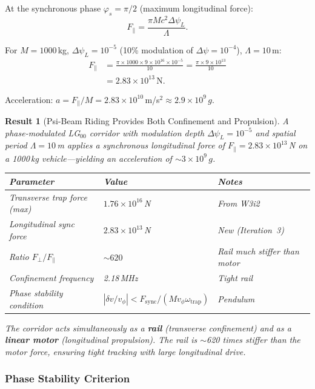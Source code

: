 \documentclass[aps,prd,twocolumn,superscriptaddress]{revtex4-2}
\newtheorem{result}{Result}
\begin{document}
At the synchronous phase $\varphi_s = \pi/2$ (maximum longitudinal force):
\begin{equation}
F_\parallel = \frac{\pi Mc^2\Delta\psi_L}{\Lambda}.
\label{eq:F_parallel}
\end{equation}

For $M = 1000$\,kg, $\Delta\psi_L = 10^{-5}$ (10\% modulation of
$\Delta\psi = 10^{-4}$), $\Lambda = 10$\,m:
\begin{align}
F_\parallel &= \frac{\pi\times1000\times9\times10^{16}\times10^{-5}}{10}
= \frac{\pi\times9\times10^{13}}{10}
\nonumber\\
&= 2.83\times10^{13}\,\mathrm{N}.
\label{eq:F_parallel_num}
\end{align}

Acceleration: $a = F_\parallel/M = 2.83\times10^{10}$\,m/s$^2 \approx 2.9\times10^9\,g$.

\begin{result}[Psi-Beam Riding Provides Both Confinement and Propulsion]
A phase-modulated LG$_{00}$ corridor with modulation depth
$\Delta\psi_L = 10^{-5}$ and spatial period $\Lambda = 10$\,m applies
a synchronous longitudinal force of $F_\parallel = 2.83\times10^{13}$\,N
on a 1000\,kg vehicle---yielding an acceleration of $\sim 3\times10^9\,g$.

\begin{tabular}{lll}
\toprule
Parameter & Value & Notes \\
\midrule
Transverse trap force (max) & $1.76\times10^{16}$\,N & From W3i2 \\
Longitudinal sync force & $2.83\times10^{13}$\,N & New (Iteration~3) \\
Ratio $F_\perp/F_\parallel$ & $\sim 620$ & Rail much stiffer than motor \\
Confinement frequency & 2.18\,MHz & Tight rail \\
Phase stability condition & $|\delta v/v_\phi| < F_\mathrm{sync}/(Mv_\phi\omega_\mathrm{trap})$ & Pendulum \\
\bottomrule
\end{tabular}

The corridor acts simultaneously as a \textbf{rail} (transverse confinement)
and as a \textbf{linear motor} (longitudinal propulsion).  The rail is
$\sim$620 times stiffer than the motor force, ensuring tight tracking
with large longitudinal drive.
\end{result}

\subsubsection{Phase Stability Criterion}
\end{document}
